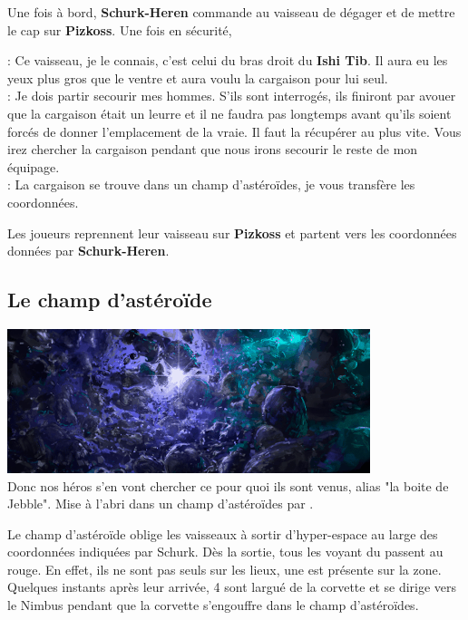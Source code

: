 Une fois à bord, \textbf{Schurk-Heren} commande au vaisseau de dégager et de mettre le cap sur \textbf{Pizkoss}. Une fois en sécurité, 
\begin{quotebox}
    : Ce vaisseau, je le connais, c’est celui du bras droit du \textbf{Ishi Tib}. Il aura eu les yeux plus gros que le ventre et aura voulu la cargaison pour lui seul.\\
    : Je dois partir secourir mes hommes. S’ils sont interrogés, ils finiront par avouer que la cargaison était un leurre et il ne faudra pas longtemps avant qu’ils soient forcés de donner l’emplacement de la vraie. Il faut la récupérer au plus vite. Vous irez chercher la cargaison pendant que nous irons secourir le reste de mon équipage.\\
    : La cargaison se trouve dans un champ d’astéroïdes, je vous transfère les coordonnées.
\end{quotebox}

Les joueurs reprennent leur vaisseau sur \textbf{Pizkoss} et partent vers les coordonnées données par \textbf{Schurk-Heren}.

\subsection{Le champ d’astéroïde}
\noindent\includegraphics[width=\linewidth]{_img/places/asteroid-field.png}\\

Donc nos héros s’en vont chercher ce pour quoi ils sont venus,  alias "la boite de Jebble". Mise à l’abri dans un champ d’astéroïdes par .

Le champ d’astéroïde oblige les vaisseaux à sortir d’hyper-espace au large des coordonnées indiquées par Schurk. Dès la sortie, tous les voyant du  passent au rouge. En effet, ils ne sont pas seuls sur les lieux, une  est présente sur la zone. Quelques instants après leur arrivée, 4  sont largué de la corvette et se dirige vers le Nimbus pendant que la corvette s’engouffre dans le champ d’astéroïdes.

